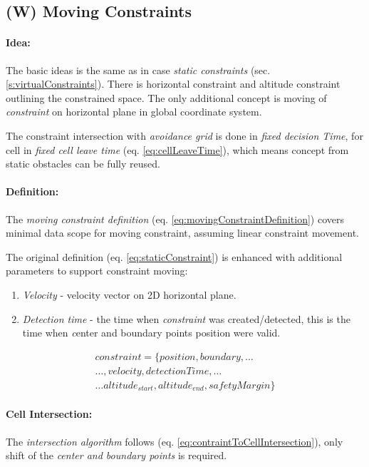 \subsection{(W) Moving Constraints}\label{s:MovingVirtualConstraints}
\paragraph{Idea:} The basic ideas is the same as in case \emph{static constraints} (sec. \ref{s:virtualConstraints}). There is horizontal constraint and altitude constraint outlining the constrained space. The only additional concept is moving of \emph{constraint} on horizontal plane in global coordinate system. 

The constraint intersection  with \emph{avoidance grid} is done in \emph{fixed decision Time}, for cell in \emph{fixed cell leave time} (eq. \ref{eq:cellLeaveTime}), which means concept from static obstacles can be fully reused.

\paragraph{Definition:} The \emph{moving constraint definition} (eq. \ref{eq:movingConstraintDefinition}) covers minimal data scope for  moving constraint, assuming linear constraint movement. 

The original definition (eq. \ref{eq:staticConstraint}) is enhanced with additional parameters to support constraint moving:

\begin{enumerate}
    \item \emph{Velocity} - velocity vector on 2D horizontal plane.
    
    \item \emph{Detection time} - the time when \emph{constraint} was created/detected, this is the time when \emph center and boundary points position were valid.
\end{enumerate}

\begin{multline}\label{eq:movingConstraintDefinition}
    constraint = \{position,boundary,\dots\\\dots, velocity, detection Time, \dots \\\dots altitude_{start},altitude_{end}, safety Margin\}
\end{multline}

\paragraph{Cell Intersection:} The \emph{intersection algorithm} follows (eq. \ref{eq:contraintToCellIntersection}), only shift of the \emph{center and boundary points} is required. 

